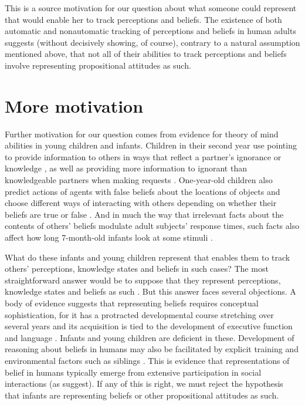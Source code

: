 \documentclass[12pt,\papersize]{extarticle}
\begin{document}
This is a source motivation for our question about what someone could represent that would enable her to track perceptions and beliefs.
The existence of both automatic and nonautomatic tracking of perceptions and beliefs in human adults 
suggests (without decisively showing, of course), 
contrary to a natural assumption mentioned above,
that not all of their abilities to track perceptions and beliefs involve representing propositional attitudes as such.

\section{More motivation}
\label{sec:more_motivation} 
Further motivation for our question comes from evidence for theory of mind abilities in young children and infants.
Children in their second year use pointing to provide information to others \citep[]{en_1093} in ways that reflect a partner’s ignorance or knowledge \citep[]{en_1699}, as well as providing more information to ignorant than knowledgeable partners when making requests \citep[]{en_1140}.  One-year-old children also predict actions of agents with false beliefs about the locations of objects \citep[]{en_1092, en_1208} and choose different ways of interacting with others depending on whether their beliefs are true or false \citep[]{en_1783,Knudsen:2011fk,southgate:2010fb}.  And in much the way that irrelevant facts about the contents of others’ beliefs modulate adult subjects’ response times, such facts also affect how long 7-month-old infants look at some stimuli \citep[]{kovacs_social_2010}.

What do these infants and young children represent that enables them to track others’ perceptions, knowledge states and beliefs in such cases?   
The most straightforward answer would be to suppose that they represent perceptions, knowledge states and beliefs as such \citep[e.g.][]{en_1138, en_1691}.  
But this answer faces several objections.  A body of evidence  suggests that representing beliefs requires conceptual sophistication, for it has a protracted developmental course stretching over several years \citep[]{en_87, en_89} and its acquisition is tied to the development of executive function \citep[]{en_410, en_1130} and language \citep[]{en_1209}.  Infants and young children are deficient in these.  
Development of reasoning about beliefs in humans may also be facilitated by explicit training \citep[]{en_85} and environmental factors such as siblings \citep[]{en_507, en_1299}.  
This is evidence that representations of belief in humans typically emerge from extensive participation in social interactions (as \citealp{en_1300} suggest).  
If any of this is right, we must reject the hypothesis that infants are representing beliefs or other propositional attitudes as such.
\end{document}
